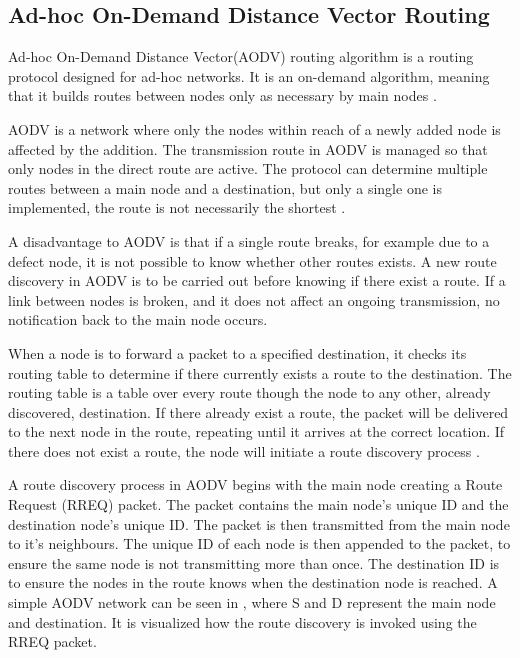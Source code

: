\subsection{Ad-hoc On-Demand Distance Vector Routing}\label{cha:AOVD1}
Ad-hoc On-Demand Distance Vector(AODV) routing algorithm is a routing protocol designed for ad-hoc networks. 
It is an on-demand algorithm, meaning that it builds routes between nodes only as necessary by main nodes \cite{AOVD1}.

AODV is a network where only the nodes within reach of a newly added node is affected by the addition.
The transmission route in AODV is managed so that only nodes in the direct route are active.
The protocol can determine multiple routes between a main node and a destination, but only a single one is implemented, the route is not necessarily the shortest \cite{AOVD1}.

A disadvantage to AODV is that if a single route breaks, for example due to a defect node, it is not possible to know whether other routes exists.
A new route discovery in AODV is to be carried out before knowing if there exist a route.
If a link between nodes is broken, and it does not affect an ongoing transmission, no notification back to the main node occurs.

When a node is to forward a packet to a specified destination, it checks its routing table to determine if there currently exists a route to the destination.
The routing table is a table over every route though the node to any other, already discovered, destination.
If there already exist a route, the packet will be delivered to the next node in the route, repeating until it arrives at the correct location.
If there does not exist a route, the node will initiate a route discovery process \cite{AOVD1}.

A route discovery process in AODV begins with the main node creating a Route Request (RREQ) packet.
The packet contains the main node's unique ID and the destination node's unique ID.
The packet is then transmitted from the main node to it's neighbours.
The unique ID of each node is then appended to the packet, to ensure the same node is not transmitting more than once.
The destination ID is to ensure the nodes in the route knows when the destination node is reached.
A simple AODV network can be seen in , where S and D represent the main node and destination. It is visualized how the route discovery is invoked using the RREQ packet.\cite{AOVD2}

